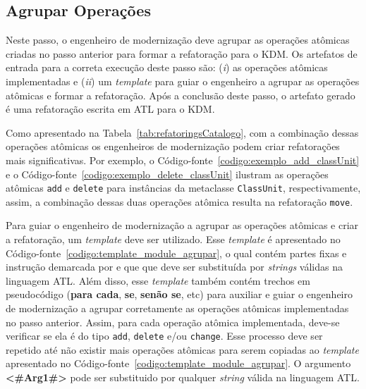 \subsection{Agrupar Operações}

Neste passo, o engenheiro de modernização deve agrupar as operações atômicas criadas no passo anterior para formar a refatoração para o KDM. Os artefatos de entrada para a correta execução deste passo são: (\textit{i}) as operações atômicas implementadas e (\textit{ii}) um \textit{template} para guiar o engenheiro a agrupar as operações atômicas e formar a refatoração. Após a conclusão deste passo, o artefato gerado é uma refatoração escrita em ATL para o KDM.

Como apresentado na Tabela~\ref{tab:refatoringsCatalogo}, com a combinação dessas operações atômicas os engenheiros de modernização podem criar refatorações mais significativas. Por exemplo, o Código-fonte~\ref{codigo:exemplo_add_classUnit} e o Código-fonte~\ref{codigo:exemplo_delete_classUnit} ilustram as operações atômicas \texttt{add} e \texttt{delete} para instâncias da metaclasse \texttt{ClassUnit}, respectivamente, assim, a combinação dessas duas operações atômica resulta na refatoração \texttt{move}. %

Para guiar o engenheiro de modernização a agrupar as operações atômicas e criar a refatoração, um \textit{template} deve ser utilizado. Esse \textit{template} é apresentado no Código-fonte~\ref{codigo:template_module_agrupar}, o qual contém partes fixas e instrução demarcada por \aspas{\textbf{<\#}} e \aspas{\textbf{\#>}} que que deve ser substituída por \textit{strings} válidas na linguagem ATL. Além disso, esse \textit{template} também contém trechos em pseudocódigo (\textbf{para cada}, \textbf{se}, \textbf{senão se}, etc) para auxiliar e guiar o engenheiro de modernização a agrupar corretamente as operações atômicas implementadas no passo anterior. Assim, para cada operação atômica implementada, deve-se verificar se ela é do tipo \texttt{add}, \texttt{delete} e/ou \texttt{change}. Esse processo deve ser repetido até não existir mais operações atômicas para serem copiadas ao \textit{template} apresentado no Código-fonte~\ref{codigo:template_module_agrupar}. O argumento \textbf{<\#Arg1\#>} pode ser substituido por qualquer \textit{string} válida na linguagem ATL.

